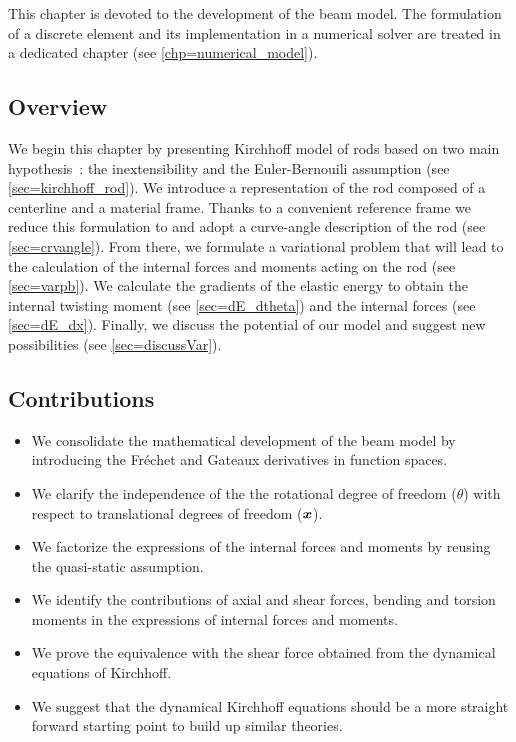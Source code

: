 This chapter is devoted to the development of the beam model. The formulation of a discrete element and its implementation in a numerical solver are treated in a dedicated chapter (see \cref{chp=numerical_model}).

\subsection{Overview}
We begin this chapter by presenting Kirchhoff model of rods based on two main hypothesis~: the inextensibility and the Euler-Bernouili assumption (see \cref{sec=kirchhoff_rod}). We introduce a  representation of the rod composed of a centerline and a material frame. Thanks to a convenient reference frame we reduce this formulation to  and adopt a curve-angle description of the rod (see \cref{sec=crvangle}). From there, we formulate a variational problem that will lead to the calculation of the internal forces and moments acting on the rod (see \cref{sec=varpb}). We calculate the gradients of the elastic energy to obtain the internal twisting moment (see \cref{sec=dE_dtheta}) and the internal forces (see \cref{sec=dE_dx}). Finally, we discuss the potential of our model and suggest new possibilities (see \cref{sec=discussVar}).

\subsection{Contributions}
\begin{itemize}
\item We consolidate the mathematical development of the beam model by introducing the Fréchet and Gateaux derivatives in function spaces.
\item We clarify the independence of the the rotational degree of freedom ($\theta$) with respect to  translational degrees of freedom ($\boldsymbol{x}$).
\item We factorize the expressions of the internal forces and moments by reusing the quasi-static assumption.
\item We identify the contributions of axial and shear forces, bending and torsion moments in the expressions of internal forces and moments.
\item We prove the equivalence with the shear force obtained from the dynamical equations of Kirchhoff.
\item We suggest that the dynamical Kirchhoff equations should be a more straight forward starting point to build up similar theories.
\end{itemize}

